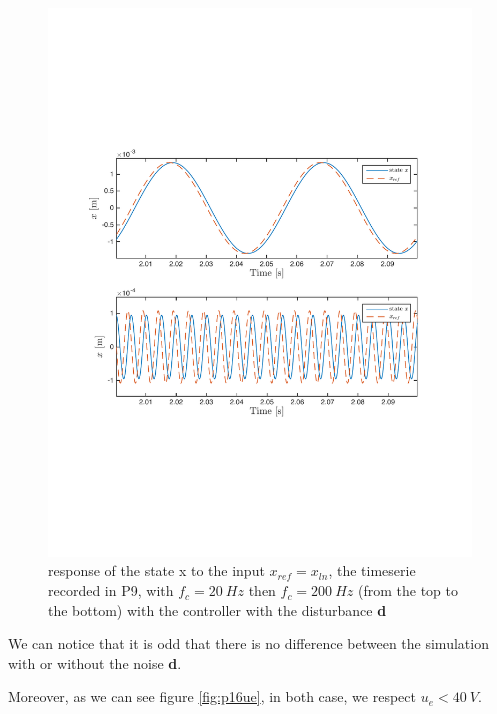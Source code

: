 \begin{figure}[H]
 \centering 
 \includegraphics[trim=2cm 7cm 2cm 7cm, clip=true, totalheight=0.35\textheight, angle=0]{figures/p16d.pdf}
 \caption{response of the state x to the input $x_{ref} = x_{ln}$, the timeserie recorded in P9, with $f_c = 20\ Hz$ then $f_c=200\ Hz$ (from the top to the bottom) with the controller with the disturbance \textbf{d}}
 \label{fig:p16d}
\end{figure}

We can notice that it is odd that there is no difference between the simulation with or without the noise \textbf{d}.


Moreover, as we can see figure \ref{fig:p16ue}, in both case, we respect $u_e < 40\ V$.

